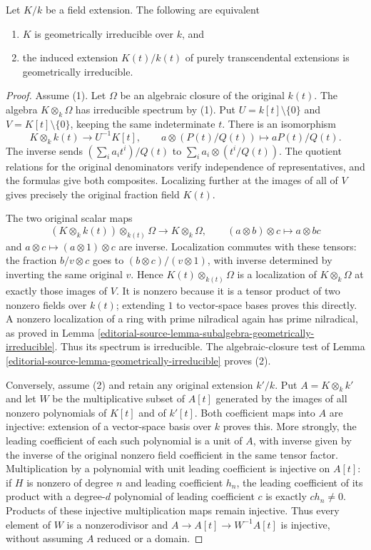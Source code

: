 \begin{lemma}
\label{editorial-source-lemma-geometrically-irreducible-base-change-transcendental}
Let $K/k$ be a field extension. The following are equivalent
\begin{enumerate}
\item $K$ is geometrically irreducible over $k$, and
\item the induced extension $K(t)/k(t)$ of purely transcendental extensions
is geometrically irreducible.
\end{enumerate}
\end{lemma}

\begin{proof}
Assume (1). Let $\Omega$ be an
algebraic closure of the original
$k(t)$. The algebra $K\otimes_k\Omega$
has irreducible spectrum by (1).
Put $U=k[t]\setminus\{0\}$ and
$V=K[t]\setminus\{0\}$, keeping
the same indeterminate $t$.
There is an isomorphism
$$
K\otimes_k k(t)\longrightarrow U^{-1}K[t],
\qquad a\otimes(P(t)/Q(t))\longmapsto aP(t)/Q(t).
$$
The inverse sends
$(\sum_i a_it^i)/Q(t)$ to
$\sum_i a_i\otimes(t^i/Q(t))$.
The quotient relations for the
original denominators verify
independence of representatives,
and the formulas give both composites.
Localizing further at the images
of all of $V$ gives precisely the
original fraction field $K(t)$.

The two original scalar maps
$$
(K\otimes_k k(t))\otimes_{k(t)}\Omega
\longrightarrow K\otimes_k\Omega,
\qquad(a\otimes b)\otimes c\longmapsto a\otimes bc
$$
and $a\otimes c\mapsto(a\otimes1)\otimes c$
are inverse. Localization commutes
with these tensors: the fraction
$b/v\otimes c$ goes to
$(b\otimes c)/(v\otimes1)$, with
inverse determined by inverting
the same original $v$. Hence
$K(t)\otimes_{k(t)}\Omega$ is a
localization of $K\otimes_k\Omega$
at exactly those images of $V$.
It is nonzero because it is a
tensor product of two nonzero
fields over $k(t)$; extending
$1$ to vector-space bases proves
this directly. A nonzero
localization of a ring with
prime nilradical again has prime
nilradical, as proved in Lemma
\ref{editorial-source-lemma-subalgebra-geometrically-irreducible}.
Thus its spectrum is irreducible.
The algebraic-closure test of Lemma
\ref{editorial-source-lemma-geometrically-irreducible}
proves (2).

Conversely, assume (2) and retain
any original extension $k'/k$.
Put $A=K\otimes_k k'$ and let $W$
be the multiplicative subset of
$A[t]$ generated by the images of
all nonzero polynomials of $K[t]$
and of $k'[t]$. Both coefficient
maps into $A$ are injective:
extension of a vector-space basis
over $k$ proves this. More strongly,
the leading coefficient of each
such polynomial is a unit of $A$,
with inverse given by the inverse
of the original nonzero field
coefficient in the same tensor
factor. Multiplication by a
polynomial with unit leading
coefficient is injective on $A[t]$:
if $H$ is nonzero of degree $n$
and leading coefficient $h_n$,
the leading coefficient of its
product with a degree-$d$
polynomial of leading coefficient
$c$ is exactly $c h_n\neq0$.
Products of these injective
multiplication maps remain
injective. Thus every element
of $W$ is a nonzerodivisor and
$A\to A[t]\to W^{-1}A[t]$ is
injective, without assuming $A$
reduced or a domain.


\end{proof}

